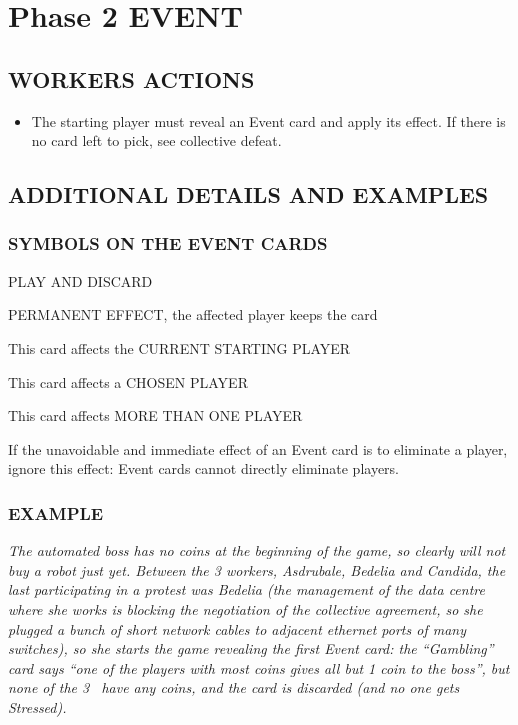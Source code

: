 \section{Phase 2 EVENT}

    \subsection{WORKERS ACTIONS}
    
        \begin{itemize}
            \item The starting player must reveal an Event card and apply its effect. If there is
            no card left to pick, see collective defeat.
        \end{itemize}

    \subsection{ADDITIONAL DETAILS AND EXAMPLES}

        \subsubsection{SYMBOLS ON THE EVENT CARDS}

            PLAY AND DISCARD

            PERMANENT EFFECT, the affected player keeps the card

            This card affects the CURRENT STARTING PLAYER

            This card affects a CHOSEN PLAYER

            This card affects MORE THAN ONE PLAYER

            If the unavoidable and immediate effect of an Event card is to eliminate a player,
            ignore this effect: Event cards cannot directly eliminate players.

        \subsubsection{EXAMPLE}

            \textit{The automated boss has no coins at the beginning of the game, so clearly will not buy a
            robot just yet. Between the 3 workers, Asdrubale, Bedelia and Candida, the last participating
            in a protest was Bedelia (the management of the data centre where she works is blocking
            the negotiation of the collective agreement, so she plugged a bunch of short network cables
            to adjacent ethernet ports of many switches), so she starts the game revealing the first Event
            card: the “Gambling” card says “one of the players with most coins gives all but 1 coin to
            the boss”, but none of the 3 \faPeopleGroup\ have any coins, and the card is discarded (and no one gets
            Stressed).}



